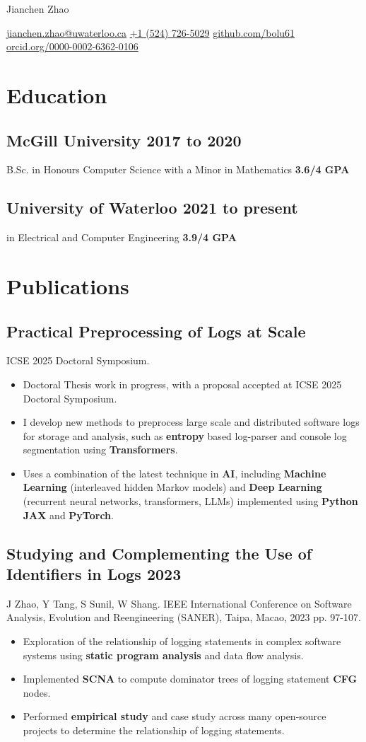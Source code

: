 \documentclass[10pt,letterpaper]{article}
\newcommand{\datedsubsection}[2]{\subsection[#1]{#1 \hfill #2}}
\newcommand{\name}[1]{\centerline{\Huge{#1}}}
\newcommand{\contact}[1]{\centerline{#1}}
\newcommand{\sep}{{\large\textperiodcentered}}
\renewcommand{\emph}[1]{{\color{emphcolor}\bfseries#1}}
\begin{document}
\name{Jianchen Zhao}
\contact{\href{mailto:jianchen.zhao@uwaterloo.ca}{jianchen.zhao@uwaterloo.ca} \sep{} \href{tel:+15147265029}{+1 (524) 726-5029} \sep{} \href{https://github.com/bolu61}{github.com/bolu61} \sep{} \href{https://orcid.org/0000-0002-6362-0106}{orcid.org/0000-0002-6362-0106}}

\section{Education}

\datedsubsection{\emph{McGill University}}{2017 to 2020}
\noindent B.Sc. in Honours Computer Science with a Minor in Mathematics \emph{3.6/4 GPA}

\datedsubsection{\emph{University of Waterloo}}{2021 to present}
\noindent \emph{Ph.D.} in Electrical and Computer Engineering \emph{3.9/4 GPA}

\section{Publications}

\subsection{Practical Preprocessing of Logs at Scale}
\noindent ICSE 2025 Doctoral Symposium.
\begin{itemize}
    \item Doctoral Thesis work in progress, with a proposal accepted at ICSE 2025 Doctoral Symposium.
    \item I develop new methods to preprocess large scale and distributed
    software logs for storage and analysis, such as \emph{entropy} based
    log-parser and console log segmentation using \emph{Transformers}.
    \item Uses a combination of the latest technique in \emph{AI}, including
    \emph{Machine Learning} (interleaved hidden Markov models) and \emph{Deep
    Learning} (recurrent neural networks, transformers, LLMs) implemented using
    \emph{Python} \emph{JAX} and \emph{PyTorch}.
\end{itemize}

\datedsubsection{Studying and Complementing the Use of Identifiers in Logs}{2023}
\noindent J Zhao, Y Tang, S Sunil, W Shang. IEEE International Conference on Software Analysis, Evolution and Reengineering (SANER), Taipa, Macao,
2023 pp. 97-107.
\begin{itemize}
    \item Exploration of the relationship of logging statements in complex
    software systems using \emph{static program analysis} and data flow analysis.
    \item Implemented \emph{SCNA} to compute dominator trees of logging statement \emph{CFG} nodes.
    \item Performed \emph{empirical study} and case study across many open-source
    projects to determine the relationship of logging statements.
\end{itemize}
\end{document}
